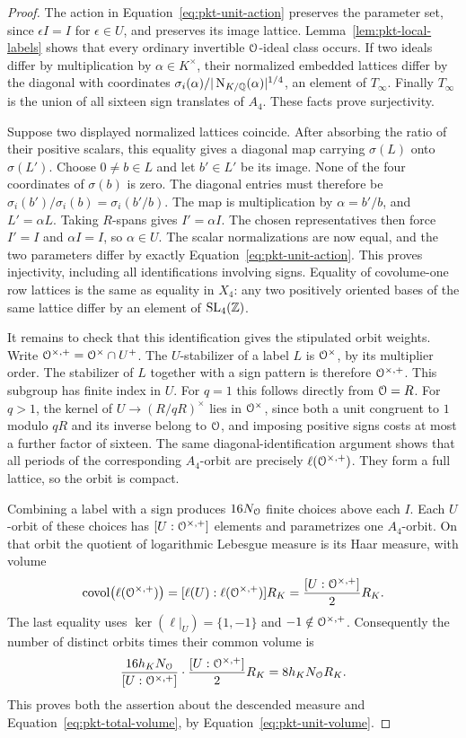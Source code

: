 \begin{proof}
The action in Equation~\eqref{eq:pkt-unit-action} preserves the
parameter set, since \(\epsilon I=I\) for \(\epsilon\in U\), and
preserves its image lattice.  Lemma~\ref{lem:pkt-local-labels} shows
that every ordinary invertible \(\mathcal O\)-ideal class occurs.  If two
ideals differ by multiplication by \(\alpha\in K^\times\), their
normalized embedded lattices differ by the diagonal with coordinates
\(\sigma_i(\alpha)/|\operatorname{N}_{K/\mathbb Q}(\alpha)|^{1/4}\), an element of
\(T_\infty\).  Finally \(T_\infty\) is the union of all sixteen
sign translates of \(A_4\).  These facts prove surjectivity.

Suppose two displayed normalized lattices coincide.  After absorbing
the ratio of their positive scalars, this equality gives a diagonal
map carrying \(\sigma(L)\) onto \(\sigma(L')\).  Choose \(0\ne b\in L\)
and let \(b'\in L'\) be its image.  None of the four coordinates of
\(\sigma(b)\) is zero.  The diagonal entries must therefore be
\(\sigma_i(b')/\sigma_i(b)=\sigma_i(b'/b)\).  The map is multiplication
by \(\alpha=b'/b\), and \(L'=\alpha L\).  Taking \(R\)-spans gives
\(I'=\alpha I\).  The chosen representatives then force \(I'=I\)
and \(\alpha I=I\), so \(\alpha\in U\).  The scalar normalizations
are now equal, and the two parameters differ by exactly
Equation~\eqref{eq:pkt-unit-action}.  This proves injectivity, including
all identifications involving signs.  Equality of covolume-one row
lattices is the same as equality in \(X_4\): any two positively oriented
bases of the same lattice differ by an element of \(\mathrm{SL}_4(\mathbb Z)\).

It remains to check that this identification gives the stipulated
orbit weights.  Write
\(\mathcal O^{\times,+}=\mathcal O^\times\cap U^+\).  The \(U\)-stabilizer of a
label \(L\) is \(\mathcal O^\times\), by its multiplier order.  The stabilizer
of \(L\) together with a sign pattern is therefore
\(\mathcal O^{\times,+}\).  This subgroup has finite index in \(U\).
For \(q=1\) this follows directly from \(\mathcal O=R\).  For \(q>1\),
the kernel of \(U\longrightarrow(R/qR)^\times\) lies in
\(\mathcal O^\times\), since both a unit congruent to \(1\) modulo \(qR\)
and its inverse belong to \(\mathcal O\), and imposing positive signs costs
at most a further factor of sixteen.  The same diagonal-identification
argument shows that all periods of the corresponding \(A_4\)-orbit
are precisely \(\ell(\mathcal O^{\times,+})\).  They form a full lattice,
so the orbit is compact.

Combining a label with a sign produces \(16N_{\mathcal O}\) finite choices
above each \(I\).  Each \(U\)-orbit of these choices has
\([U:\mathcal O^{\times,+}]\) elements and parametrizes one \(A_4\)-orbit.
On that orbit the quotient of logarithmic Lebesgue measure is its
Haar measure, with volume
\[
 \operatorname{covol}\bigl(\ell(\mathcal O^{\times,+})\bigr)
 =[\ell(U):\ell(\mathcal O^{\times,+})]R_K
 =\frac{[U:\mathcal O^{\times,+}]}{2}R_K .
\]
The last equality uses \(\ker(\ell|_U)=\{1,-1\}\) and
\(-1\notin\mathcal O^{\times,+}\).  Consequently the number of distinct
orbits times their common volume is
\[
 \frac{16h_KN_{\mathcal O}}{[U:\mathcal O^{\times,+}]}
 \cdot \frac{[U:\mathcal O^{\times,+}]}2 R_K
 =8h_KN_{\mathcal O}R_K.
\]
This proves both the assertion about the descended measure and
Equation~\eqref{eq:pkt-total-volume}, by
Equation~\eqref{eq:pkt-unit-volume}.


\end{proof}
